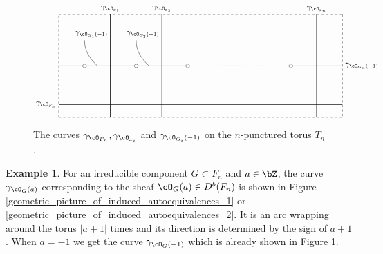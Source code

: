 \documentclass[12pt]{amsart}
\numberwithin{equation}{section}
\theoremstyle{plain}
\theoremstyle{definition}
\newtheorem{example}[theorem]{Example}
\begin{document}
\begin{figure}[h]
    \centering
    \begin{displaymath}
        \begin{tikzpicture}[scale=1.2]
            \draw[dashed] (0,0)--(11,0);
            \draw[dashed] (0,0)--(0,4);
            \draw[dashed] (0,4)--(11,4);
            \draw[dashed] (11,4)--(11,0);

            \draw[thick] (0, 2)--(1, 2);
            \draw[thick] (1, 2)--(3, 2);
            \draw[thick] (3, 2)--(5, 2);
            \draw[thick] (9, 2)--(11, 2);

            \draw[thick] (0, 0.5)--(11, 0.5);

            \draw[thick] (2, 0)--(2, 4);
            \draw[thick] (4, 0)--(4, 4);
            \draw[thick] (10, 0)--(10, 4);

            \draw[dotted, thick] (5+1, 2)--(9-1, 2);
            \foreach \u in {1, 3, 5, 9}
                {
                    \filldraw[white] (\u, 2) circle (2pt);
                    \draw[black] (\u, 2) circle (2pt);
                }

            \draw(0, 0.5) node[left]{$\gamma_{\cO_{F_n}}$};
            \draw(2, 4) node[above]{$\gamma_{\cO_{x_1}}$};
            \draw(4, 4) node[above]{$\gamma_{\cO_{x_2}}$};
            \draw(10, 4) node[above]{$\gamma_{\cO_{x_n}}$};

            \draw(2, 3) node[above left]{$\gamma_{\cO_{G_1}(-1)}$};
            \draw(1, 3) to[out=-90,in=135](1.5, 2);
            \draw(4, 3) node[above left]{$\gamma_{\cO_{G_2}(-1)}$};
            \draw(3, 3) to[out=-90,in=135](3.5, 2);

            \draw(11, 2) node[right]{$\gamma_{\cO_{G_n}(-1)}$};

        \end{tikzpicture}
    \end{displaymath}
    \caption{The curves $\gamma_{\cO_{F_n}}, \gamma_{\cO_{x_i}}$ and $\gamma_{\cO_{G_i}(-1)}$ on the $n$-punctured torus $T_n$.}
    \label{fig:corresponding-curves-via-hms}
\end{figure}

\begin{example}
    For an irreducible component $G \subset F_n$ and $a \in \bZ$, the curve $\gamma_{\cO_G(a)}$ corresponding to the sheaf $\cO_G(a) \in D^b(F_n)$ is shown in Figure \ref{geometric_picture_of_induced_autoequivalences_1} or \ref{geometric_picture_of_induced_autoequivalences_2}.
    It is an arc wrapping around the torus $|a + 1|$ times and its direction is determined by the sign of $a + 1$.
    When $a = -1$ we get the curve $\gamma_{\cO_G(-1)}$ which is already shown in Figure \ref{fig:corresponding-curves-via-hms}.
\end{example}
\end{document}
